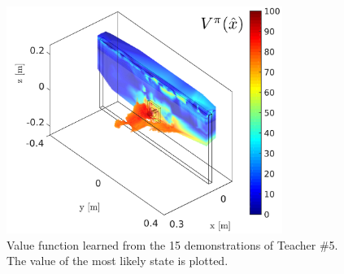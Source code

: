 \begin{figure}
 \centering
 \includegraphics[width=0.8\textwidth]{./ch4-PiH/Figures/Fig/value_subj_5.pdf}
 \caption{Value function learned from the 15 demonstrations of Teacher \#5. The value of the most likely state is plotted.}
 \label{fig:value_function_subj_5}
\end{figure}
 
